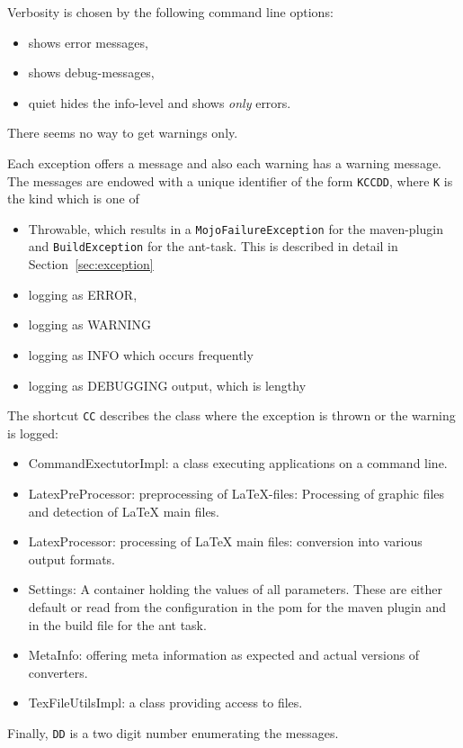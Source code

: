 Verbosity is chosen by the following command line options: 
%
\begin{itemize}
\item[\texttt{-e}] shows error messages, 
\item[\texttt{-X}] shows debug-messages, 
\item[\texttt{-q}] quiet hides the info-level and shows \emph{only} errors. 
\end{itemize}
%
There seems no way to get warnings only. 

Each exception offers a message and also each warning has a warning message. 
The messages are endowed with a unique identifier of the form 
\texttt{KCCDD}, where \texttt{K} is the kind which is one of 
%
\begin{itemize}
\item[T] Throwable, 
which results in a \texttt{MojoFailureException} for the maven-plugin 
and \texttt{BuildException} for the ant-task. 
This is described in detail in Section~\ref{sec:exception} 
\item[E] logging as ERROR, 
\item[W] logging as WARNING 
\item[I] logging as INFO which occurs frequently
\item[D] logging as DEBUGGING output, which is lengthy 
\end{itemize}

The shortcut \texttt{CC} describes the class where the exception is thrown 
or the warning is logged: 
%
\begin{itemize}
\item[EX] CommandExectutorImpl: 
a class executing applications on a command line. 
\item[PP] LatexPreProcessor: preprocessing of \LaTeX-files: 
Processing of graphic files and detection of \LaTeX{} main files. 
\item[LP] LatexProcessor: processing of \LaTeX{} main files: 
conversion into various output formats. 
\item[SS] Settings: A container holding the values of all parameters. 
These are either default or read from the configuration 
in the pom for the maven plugin and in the build file for the ant task. 
\item[MI] MetaInfo: offering meta information
  as expected and actual versions of converters. 
\item[FU] TexFileUtilsImpl: a class providing access to files. 
\end{itemize}
%
Finally, \texttt{DD} is a two digit number enumerating the messages.


